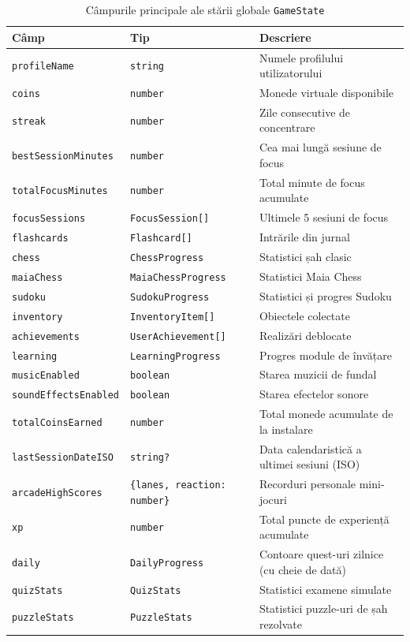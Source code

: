 \documentclass[12pt, a4paper, twoside]{report}
\numberwithin{equation}{section}
\begin{document}
\begin{table}[H]
\centering
\caption{Câmpurile principale ale stării globale \texttt{GameState}}
\label{tab:gamestate}
\begin{tabular}{lll}
\toprule
\textbf{Câmp} & \textbf{Tip} & \textbf{Descriere} \\
\midrule
\texttt{profileName} & \texttt{string} & Numele profilului utilizatorului \\
\texttt{coins} & \texttt{number} & Monede virtuale disponibile \\
\texttt{streak} & \texttt{number} & Zile consecutive de concentrare \\
\texttt{bestSessionMinutes} & \texttt{number} & Cea mai lungă sesiune de focus \\
\texttt{totalFocusMinutes} & \texttt{number} & Total minute de focus acumulate \\
\texttt{focusSessions} & \texttt{FocusSession[]} & Ultimele 5 sesiuni de focus \\
\texttt{flashcards} & \texttt{Flashcard[]} & Intrările din jurnal \\
\texttt{chess} & \texttt{ChessProgress} & Statistici șah clasic \\
\texttt{maiaChess} & \texttt{MaiaChessProgress} & Statistici Maia Chess \\
\texttt{sudoku} & \texttt{SudokuProgress} & Statistici și progres Sudoku \\
\texttt{inventory} & \texttt{InventoryItem[]} & Obiectele colectate \\
\texttt{achievements} & \texttt{UserAchievement[]} & Realizări deblocate \\
\texttt{learning} & \texttt{LearningProgress} & Progres module de învățare \\
\texttt{musicEnabled} & \texttt{boolean} & Starea muzicii de fundal \\
\texttt{soundEffectsEnabled} & \texttt{boolean} & Starea efectelor sonore \\
\texttt{totalCoinsEarned} & \texttt{number} & Total monede acumulate de la instalare \\
\texttt{lastSessionDateISO} & \texttt{string?} & Data calendaristică a ultimei sesiuni (ISO) \\
\texttt{arcadeHighScores} & \texttt{\{lanes, reaction: number\}} & Recorduri personale mini-jocuri \\
\texttt{xp} & \texttt{number} & Total puncte de experiență acumulate \\
\texttt{daily} & \texttt{DailyProgress} & Contoare quest-uri zilnice (cu cheie de dată) \\
\texttt{quizStats} & \texttt{QuizStats} & Statistici examene simulate \\
\texttt{puzzleStats} & \texttt{PuzzleStats} & Statistici puzzle-uri de șah rezolvate \\
\bottomrule
\end{tabular}
\end{table}
\end{document}
